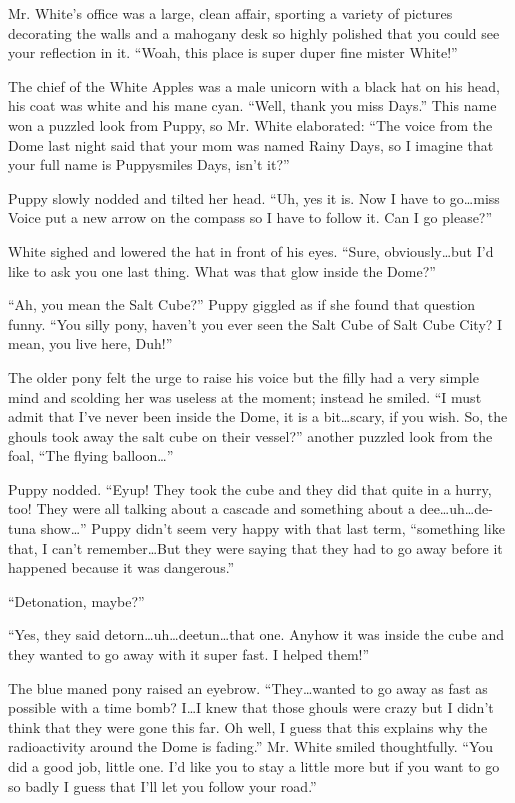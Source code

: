 Mr. White's office was a large, clean affair, sporting a variety of pictures decorating the walls and a mahogany desk so highly polished that you could see your reflection in it. ``Woah, this place is super duper fine mister White!''

The chief of the White Apples was a male unicorn with a black hat on his head, his coat was white and his mane cyan. ``Well, thank you miss Days.'' This name won a puzzled look from Puppy, so Mr. White elaborated: ``The voice from the Dome last night said that your mom was named Rainy Days, so I imagine that your full name is Puppysmiles Days, isn't it?''

Puppy slowly nodded and tilted her head. ``Uh, yes it is. Now I have to go\dots miss Voice put a new arrow on the compass so I have to follow it. Can I go please?''

White sighed and lowered the hat in front of his eyes. ``Sure, obviously\dots but I'd like to ask you one last thing. What was that glow inside the Dome?''

``Ah, you mean the Salt Cube?'' Puppy giggled as if she found that question funny. ``You silly pony, haven't you ever seen the Salt Cube of Salt Cube City? I mean, you live here, Duh!''

The older pony felt the urge to raise his voice but the filly had a very simple mind and scolding her was useless at the moment; instead he smiled. ``I must admit that I've never been inside the Dome, it is a bit\dots scary, if you wish. So, the ghouls took away the salt cube on their vessel?'' another puzzled look from the foal, ``The flying balloon\dots''

Puppy nodded. ``Eyup! They took the cube and they did that quite in a hurry, too! They were all talking about a cascade and something about a dee\dots uh\dots de-tuna show\dots'' Puppy didn't seem very happy with that last term, ``something like that, I can't remember\dots But they were saying that they had to go away before it happened because it was dangerous.''

``Detonation, maybe?''

``Yes, they said detorn\dots uh\dots deetun\dots that one. Anyhow it was inside the cube and they wanted to go away with it super fast. I helped them!''

The blue maned pony raised an eyebrow. ``They\dots wanted to go away as fast as possible with a time bomb? I\dots I knew that those ghouls were crazy but I didn't think that they were gone this far. Oh well, I guess that this explains why the radioactivity around the Dome is fading.'' Mr. White smiled thoughtfully. ``You did a good job, little one. I'd like you to stay a little more but if you want to go so badly I guess that I'll let you follow your road.''


